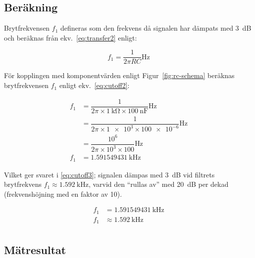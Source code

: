 \subsection{Beräkning}
Brytfrekvensen $f_1$ defineras som den frekvens då signalen har dämpats med
\SI{3}{\dB} och beräknas från ekv.~\eqref{eq:transfer2} enligt:

\begin{equation}\label{eq:cutoff}
  f_1 = \dfrac{1}{2 \pi R C} \si{\Hz}
\end{equation}

För kopplingen med komponentvärden enligt Figur~\ref{fig:rc-schema} beräknas
brytfrekvensen $f_1$ enligt ekv.~\eqref{eq:cutoff2}:

\begin{equation}\label{eq:cutoff2}
  \begin{split}
    f_1 &= \dfrac{1}{2 \pi \times \SI{1}{\kohm} \times \SI{100}{\nano\farad}} \si{\Hz} \\
        &= \dfrac{1}{2 \pi \times \num{1e3} \times \num{100e-6}} \si{\Hz}              \\
        &= \dfrac{10^6}{2 \pi \times 10^3 \times \num{100}} \si{\Hz}                   \\
    f_1 &= \SI{1.591549431}{\kHz}
  \end{split}
\end{equation}

Vilket ger svaret i \eqref{eq:cutoff3}; signalen dämpas med \SI{3}{\dB} vid
filtrets brytfrekvens $f_1 \approx \SI{1.592}{\kHz}$, varvid den ``rullas av''
med \SI{20}{\dB} per dekad (frekvenshöjning med en faktor av 10). 

\begin{equation}\label{eq:cutoff3}
  \begin{split}
    f_1 &= \SI{1.591549431}{\kHz} \\
    f_1 &\approx \SI{1.592}{\kHz} \\
  \end{split}
\end{equation}


\subsection{Mätresultat}

